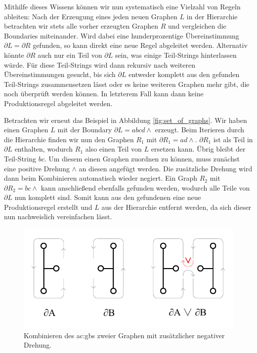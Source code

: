 Mithilfe dieses Wissens können wir nun systematisch eine Vielzahl von Regeln ableiten:
Nach der Erzeugung eines jeden neuen Graphen \(L\) in der Hierarchie betrachten wir stets alle vorher erzeugten Graphen \(R\) und vergleichen die Boundaries
miteinander. Wird dabei eine hunderprozentige Übereinstimmung \(\partial L = \partial R\) gefunden, so kann direkt eine neue Regel abgeleitet werden.
Alternativ könnte \(\partial R\) auch nur ein Teil von \(\partial L\) sein, was einige Teil-Strings hinterlassen würde. Für diese Teil-Strings wird dann
rekursiv nach weiteren Übereinstimmungen gesucht, bis sich \(\partial L \) entweder komplett aus den gefunden Teil-Strings zusammensetzen lässt oder
es keine weiteren Graphen mehr gibt, die noch überprüft werden können. In letzterem Fall kann dann keine Produktionsregel abgeleitet werden.

Betrachten wir erneut das Beispiel in Abbildung \ref{fig:set_of_graphs}. Wir haben einen Graphen \(L\) mit der Boundary \(\partial L = abcd\wedge \) erzeugt.
Beim Iterieren durch die Hierarchie finden wir nun den Graphen \(R_1\) mit \(\partial R_1 = ad\wedge \). \(\partial R_1\) ist als Teil in \(\partial L \)
enthalten, wodurch \(R_1\) also einen Teil von \(L\) ersetzen kann. Übrig bleibt der Teil-String \(bc\). Um diesem einen Graphen zuordnen zu können,
muss zunächst eine positive Drehung \(\wedge \) an diesen angefügt werden. Die zusätzliche Drehung wird dann beim Kombinieren automatisch wieder negiert.
Ein Graph \(R_2\) mit \(\partial R_2 = bc\wedge \) kann anschließend ebenfalls gefunden werden, wodurch alle Teile von \(\partial L\) nun komplett sind. Somit kann
aus den gefundenen eine neue Produktionsregel erstellt und \(L\) aus der Hierarchie entfernt werden, da sich dieser nun nachweislich vereinfachen lässt.

\begin{figure}[t]
    \centering
    \includegraphics[width=(\imgWidth*3/4)]{images/splicing.pdf}
    \caption{Kombinieren des \gls{ac:gbs} zweier Graphen mit zusätzlicher negativer Drehung.}
    \label{fig:splicing}
\end{figure}

